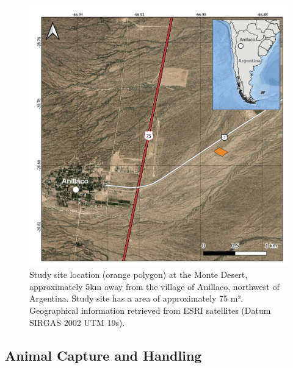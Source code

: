 \documentclass[english,msc,numbers,hidelinks]{coppe}
\begin{document}
  \begin{figure}

  {\centering \includegraphics[width=1\linewidth]{../04_figures/map/tuco_map} 

  }

  \caption{Study site location (orange polygon) at the Monte Desert, approximately 5km away from the village of Anillaco, northwest of Argentina. Study site has a area of approximately 75 m². Geographical information retrieved from ESRI satellites (Datum SIRGAS 2002 UTM 19s).}\label{fig:methods-map}
  \end{figure}
  \hypertarget{animal-capture-and-handling}{%
  \subsection{Animal Capture and Handling}\label{animal-capture-and-handling}}
\end{document}
